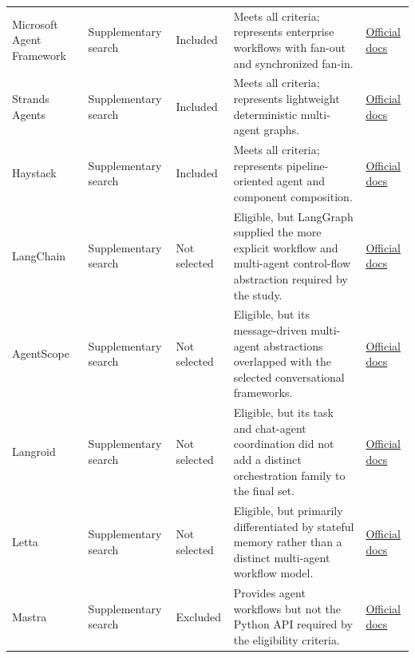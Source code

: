 \begin{longtable}{
    @{}
    p{}
    p{}
    >{\centering\arraybackslash}p{}
    p{}
    p{}
    @{}
}
    Microsoft Agent Framework
    & Supplementary search
    & \cellcolor{green!25}Included
    & Meets all criteria; represents enterprise workflows with fan-out and
    synchronized fan-in.
    & \href{https://learn.microsoft.com/en-us/agent-framework/}{Official docs} \\

    Strands Agents
    & Supplementary search
    & \cellcolor{green!25}Included
    & Meets all criteria; represents lightweight deterministic multi-agent
    graphs.
    & \href{https://strandsagents.com/docs/}{Official docs} \\

    Haystack
    & Supplementary search
    & \cellcolor{green!25}Included
    & Meets all criteria; represents pipeline-oriented agent and component
    composition.
    & \href{https://docs.haystack.deepset.ai/docs/agent}{Official docs} \\

    LangChain
    & Supplementary search
    & Not selected
    & Eligible, but LangGraph supplied the more explicit workflow and
    multi-agent control-flow abstraction required by the study.
    & \href{https://docs.langchain.com/oss/python/langchain/overview}
    {Official docs} \\

    AgentScope
    & Supplementary search
    & Not selected
    & Eligible, but its message-driven multi-agent abstractions overlapped with
    the selected conversational frameworks.
    & \href{https://doc.agentscope.io/}{Official docs} \\

    Langroid
    & Supplementary search
    & Not selected
    & Eligible, but its task and chat-agent coordination did not add a distinct
    orchestration family to the final set.
    & \href{https://langroid.github.io/langroid/}{Official docs} \\

    Letta
    & Supplementary search
    & Not selected
    & Eligible, but primarily differentiated by stateful memory rather than a
    distinct multi-agent workflow model.
    & \href{https://docs.letta.com/}{Official docs} \\

    Mastra
    & Supplementary search
    & Excluded
    & Provides agent workflows but not the Python API required by the
    eligibility criteria.
    & \href{https://mastra.ai/docs}{Official docs} \\


\end{longtable}
